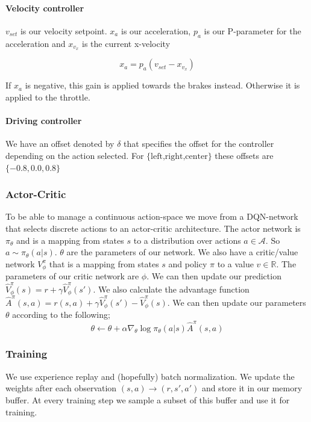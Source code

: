 \documentclass{article}
\begin{document}
\paragraph{Velocity controller}

$v_{set}$ is our velocity setpoint. $x_a$ is our acceleration, $p_a$ is our P-parameter for the acceleration and $x_{v_x}$ is the current x-velocity

\[
	x_a = p_a (v_{set} - x_{v_x})
\]

If $x_a$ is negative, this gain is applied towards the brakes instead. Otherwise it is applied to the throttle.

\paragraph{Driving controller}

We have an offset denoted by $\delta$ that specifies the offset for the controller depending on the action selected. For ${\text{\{left,right,center}\}}$ these offsets are $\{-0.8, 0.0, 0.8\}$

\subsubsection{Actor-Critic}

To be able to manage a continuous action-space we move from a DQN-network that selects discrete actions to an actor-critic architecture. The actor network is $\pi_\theta$ and is a mapping from states $s$ to a distribution over actions $a \in \mathcal{A}$. So $a \sim \pi_\theta(a|s)$. $\theta$ are the parameters of our network. We also have a critic/value network $V_\phi^\pi$ that is a mapping from states $s$ and policy $\pi$ to a value $v \in \mathbb{R}$. The parameters of our critic network are $\phi$.
We can then update our prediction $\hat{V}_\phi^\pi (s)= r + \gamma \hat{V}_\phi^\pi (s')$. We also calculate the advantage function $\hat{A}^\pi (s,a) = r(s,a) + \gamma \hat{V}_\phi^\pi (s') - \hat{V}_\phi^\pi (s).$
We can then update our parameters $\theta$ according to the following;
\[
	\theta \leftarrow \theta + \alpha \nabla_\theta \log \pi_\theta (a|s) \hat{A}^\pi (s,a)
\]
\subsubsection{Training}

We use experience replay and (hopefully) batch normalization. We update the weights after each observation $(s,a) \rightarrow (r,s',a')$ and store it in our memory buffer. At every training step we sample a subset of this buffer and use it for training.
\end{document}
